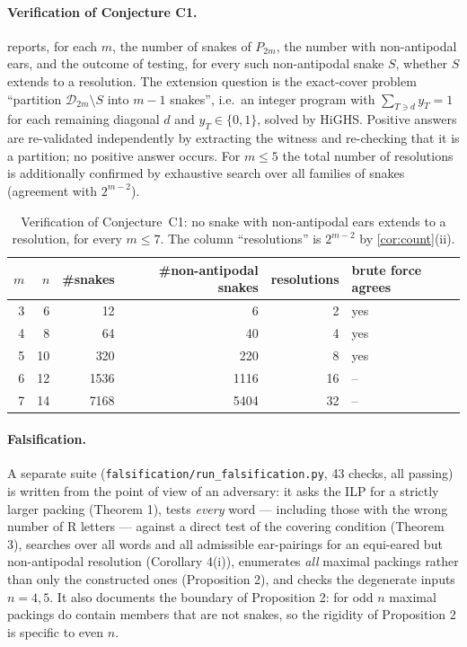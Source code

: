 \documentclass[11pt,a4paper]{article}
\theoremstyle{definition}
\theoremstyle{remark}
\newcommand{\diags}{\ensuremath{\mathcal{D}}}
\newcommand{\Ri}{\mathrm{R}}
\begin{document}
\paragraph{Verification of Conjecture C1.}
 reports, for each $m$, the number of snakes of $P_{2m}$, the number with
non-antipodal ears, and the outcome of testing, for every such non-antipodal snake $S$,
whether $S$ extends to a resolution.  The extension question is the exact-cover problem
``partition $\diags_{2m}\setminus S$ into $m-1$ snakes'', i.e.\ an integer program with
$\sum_{T\ni d}y_T=1$ for each remaining diagonal $d$ and $y_T\in\{0,1\}$, solved by HiGHS.
Positive answers are re-validated independently by extracting the witness and re-checking
that it is a partition; no positive answer occurs.  For $m\le5$ the total number of
resolutions is additionally confirmed by exhaustive search over all families of snakes
(agreement with $2^{m-2}$).

\begin{table}[h]
\centering\small
\begin{tabular}{rrrrrl}
\toprule
$m$ & $n$ & \#snakes & \#non-antipodal snakes & resolutions & brute force agrees\\
\midrule
3 & 6  & 12    & 6    & 2  & yes\\
4 & 8  & 64    & 40   & 4  & yes\\
5 & 10 & 320   & 220  & 8  & yes\\
6 & 12 & 1536  & 1116 & 16 & --\\
7 & 14 & 7168  & 5404 & 32 & --\\
\bottomrule
\end{tabular}
\caption{Verification of Conjecture~C1: no snake with non-antipodal ears extends to a
resolution, for every $m\le7$.  The column ``resolutions'' is $2^{m-2}$ by
\cref{cor:count}(ii).}
\label{tab:conj}
\end{table}

\paragraph{Falsification.}  A separate suite
(\texttt{falsification/run\_falsification.py}, 43 checks, all passing) is written from the
point of view of an adversary: it asks the ILP for a strictly larger packing (Theorem 1),
tests \emph{every} word --- including those with the wrong number of $\Ri$ letters --- against a
direct test of the covering condition (Theorem 3), searches over all words and all admissible
ear-pairings for an equi-eared but non-antipodal resolution (Corollary 4(i)), enumerates
\emph{all} maximal packings rather than only the constructed ones (Proposition 2), and checks
the degenerate inputs $n=4,5$.  It also documents the boundary of Proposition 2: for odd $n$
maximal packings do contain members that are not snakes, so the rigidity of Proposition 2 is
specific to even $n$.
\end{document}
